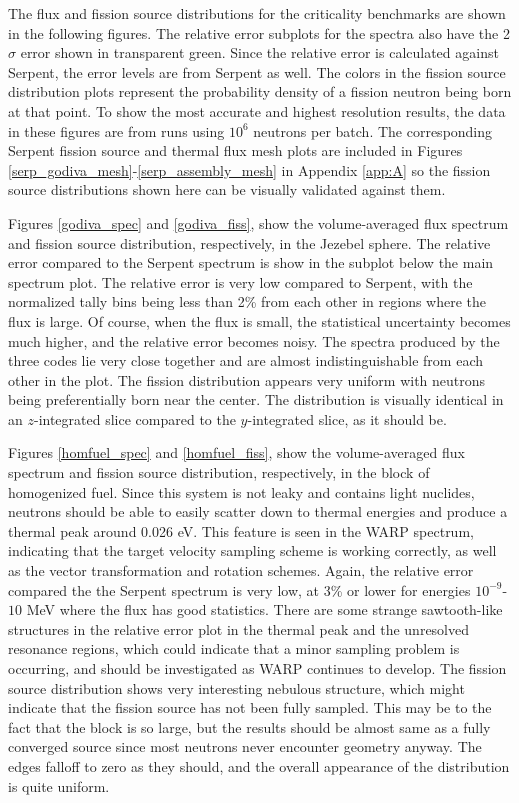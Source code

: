 The flux and fission source distributions for the criticality benchmarks are shown in the following figures.  The relative error subplots for the spectra also have the 2$\sigma$ error shown in transparent green.  Since the relative error is calculated against Serpent, the error levels are from Serpent as well.  The colors in the fission source distribution plots represent the probability density of a fission neutron being born at that point.  To show the most accurate and highest resolution results, the data in these figures are from runs using $10^6$ neutrons per batch.  The corresponding Serpent fission source and thermal flux mesh plots are included in Figures \ref{serp_godiva_mesh}-\ref{serp_assembly_mesh} in Appendix \ref{app:A} so the fission source distributions shown here can be visually validated against them.  

Figures \ref{godiva_spec} and \ref{godiva_fiss}, show the volume-averaged flux spectrum and fission source distribution, respectively, in the Jezebel sphere.  The relative error compared to the Serpent spectrum is show in the subplot below the main spectrum plot.  The relative error is very low compared to Serpent, with the normalized tally bins being less than 2\% from each other in regions where the flux is large.  Of course, when the flux is small, the statistical uncertainty becomes much higher, and the relative error becomes noisy.  The spectra produced by the three codes lie very close together and are almost indistinguishable from each other in the plot.  The fission distribution appears very uniform with neutrons being preferentially born near the center.  The distribution is visually identical in an $z$-integrated slice compared to the $y$-integrated slice, as it should be.

Figures \ref{homfuel_spec} and \ref{homfuel_fiss}, show the volume-averaged flux spectrum and fission source distribution, respectively, in the block of homogenized fuel.  Since this system is not leaky and contains light nuclides, neutrons should be able to easily scatter down to thermal energies and produce a thermal peak around 0.026 eV.  This feature is seen in the WARP spectrum, indicating that the target velocity sampling scheme is working correctly, as well as the vector transformation and rotation schemes.  Again, the relative error compared the the Serpent spectrum is very low, at 3\% or lower for energies $10^{-9}$-$10$ MeV where the flux has good statistics.  There are some strange sawtooth-like structures in the relative error plot in the thermal peak and the unresolved resonance regions, which could indicate that a minor sampling problem is occurring, and should be investigated as WARP continues to develop.  The fission source distribution shows very interesting nebulous structure, which might indicate that the fission source has not been fully sampled.  This may be to the fact that the block is so large, but the results should be almost same as a fully converged source since most neutrons never encounter geometry anyway.  The edges falloff to zero as they should, and the overall appearance of the distribution is quite uniform.

